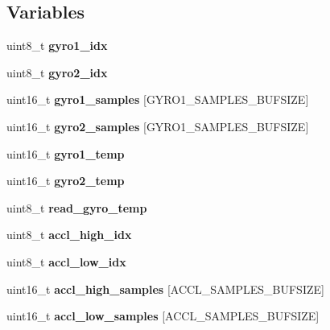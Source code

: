 \subsection*{Variables}
\begin{CompactItemize}
\item 
uint8\_\-t {\bf gyro1\_\-idx}
\item 
uint8\_\-t {\bf gyro2\_\-idx}
\item 
uint16\_\-t {\bf gyro1\_\-samples} [GYRO1\_\-SAMPLES\_\-BUFSIZE]
\item 
uint16\_\-t {\bf gyro2\_\-samples} [GYRO1\_\-SAMPLES\_\-BUFSIZE]
\item 
uint16\_\-t {\bf gyro1\_\-temp}
\item 
uint16\_\-t {\bf gyro2\_\-temp}
\item 
uint8\_\-t {\bf read\_\-gyro\_\-temp}
\item 
uint8\_\-t {\bf accl\_\-high\_\-idx}
\item 
uint8\_\-t {\bf accl\_\-low\_\-idx}
\item 
uint16\_\-t {\bf accl\_\-high\_\-samples} [ACCL\_\-SAMPLES\_\-BUFSIZE]
\item 
uint16\_\-t {\bf accl\_\-low\_\-samples} [ACCL\_\-SAMPLES\_\-BUFSIZE]
\end{CompactItemize}
